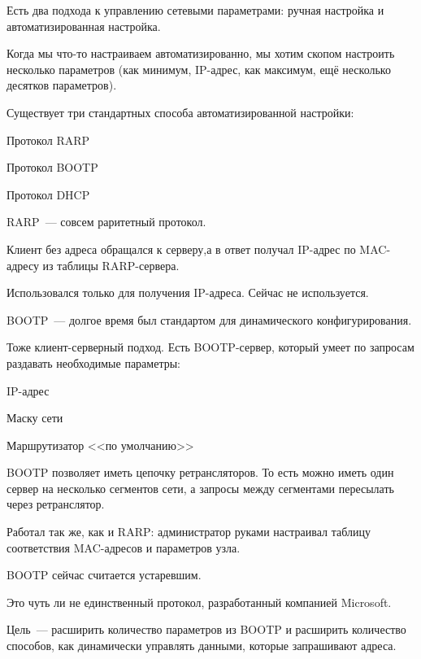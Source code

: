 
Есть два подхода к управлению сетевыми параметрами: ручная настройка и автоматизированная настройка. 

Когда мы что-то настраиваем автоматизированно, мы хотим скопом настроить несколько параметров (как минимум, IP-адрес, как максимум, ещё несколько десятков параметров).

Существует три стандартных способа автоматизированной настройки:
\begin{MyItemize}
    \item Протокол RARP
    \item Протокол BOOTP
    \item Протокол DHCP
\end{MyItemize}


RARP~--- совсем раритетный протокол.

Клиент без адреса обращался к серверу,а в ответ получал IP-адрес по MAC-адресу из таблицы RARP-сервера.

Использовался только для получения IP-адреса. Сейчас не используется.

BOOTP~--- долгое время был стандартом для динамического конфигурирования.

Тоже клиент-серверный подход. Есть BOOTP-сервер, который умеет по запросам раздавать необходимые параметры:
\begin{MyItemize}
    \item IP-адрес
    \item Маску сети
    \item Маршрутизатор <<по умолчанию>>
\end{MyItemize}

BOOTP позволяет иметь цепочку ретрансляторов. То есть можно иметь один сервер на несколько сегментов сети, а запросы между сегментами пересылать через ретранслятор.

Работал так же, как и RARP: администратор руками настраивал таблицу соответствия MAC-адресов и параметров узла.

BOOTP сейчас считается устаревшим.


Это чуть ли не единственный протокол, разработанный компанией Microsoft.

Цель~--- расширить количество параметров из BOOTP и расширить количество способов, как динамически управлять данными, которые запрашивают адреса.

